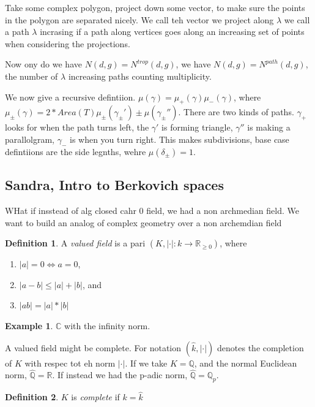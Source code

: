 \documentclass[12pt]{memoir}
\theoremstyle{definition}
\newtheorem{protoexample}{Example}[section]
\newenvironment{ex}
   {\begin{protoexample}}
   {\end{protoexample}}
\newtheorem{protodefinition}{Definition}[section]
\newenvironment{define}
   {\begin{protodefinition}}
   {\end{protodefinition}}
\def\QQ{{\mathbb Q}}
\def\RR{{\mathbb R}}
\def\CC{{\mathbb C}}
\begin{document}
Take some complex polygon, project down some vector, to make sure the points in the polygon are separated nicely. We call teh vector we project along $\lambda$ we call a path $\lambda$ incrasing if a path along vertices goes along an increasing set of points when considering the projections. 

Now ony do we have $N(d,g)=N^{trop}(d,g)$, we have $N(d,g)=N^{path}(d,g)$, the number of $\lambda$ increasing paths counting multiplicity.


We now give a recursive defintiion. $\mu(\gamma)=\mu_+(\gamma)\mu_-(\gamma)$, where $\mu_\pm(\gamma) = 2 *Area(T) \mu_\pm(\gamma_\pm')\pm \mu(\gamma_\pm'')$. There are two kinds of paths. $\gamma_+$ looks for when the path turns left, the $\gamma'$ is forming triangle, $\gamma''$ is making a parallolgram, $\gamma_-$ is when you turn right. This makes subdivisions, base case defintiions are the side legnths, wehre $\mu(\delta_\pm)=1$.




\subsection{Sandra, Intro to Berkovich spaces}


WHat if insstead of alg closed cahr 0 field, we had a non archmedian field. We want to build an analog of complex geometry over a non archemdian field

\begin{define}
    A \emph{valued field} is a pari $(K,|\cdot|:k \rightarrow \RR_{\geq0})$, where 
    \begin{enumerate}
        \item $|a|= 0 \iff a=0$,
        \item $|a-b| \leq |a| + |b|$, and 
        \item $|ab|=|a|*|b|$
    \end{enumerate}
\end{define}


\begin{ex}
    $\CC$ with the infinity norm.
\end{ex}


A valued field might be complete. For notation $(\hat{k}, |\cdot|)$ denotes the completion of $K$ with respec tot eh norm $|\cdot|$. If we take $K=\QQ$, and the normal Euclidean norm, $\hat{\QQ} = \RR$. If instead we had the p-adic norm, $\hat{\QQ} = \QQ_p$.

\begin{define}
    $K$ is \emph{complete} if $k=\hat{k}$
\end{define}
\end{document}
